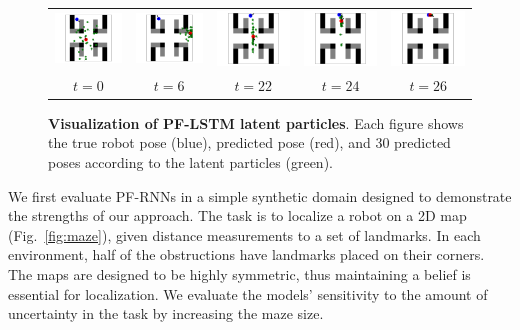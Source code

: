 \documentclass[letterpaper]{article} %
\begin{document}
\begin{figure}[t]
	\centering
	\begin{tabular}{ccccc}
		\includegraphics[width=0.18\linewidth]{figs/0.pdf} &
		\includegraphics[width=0.18\linewidth]{figs/6.pdf} &
		\includegraphics[width=0.18\linewidth]{figs/22.pdf} &
		\includegraphics[width=0.18\linewidth]{figs/24.pdf} &
		\includegraphics[width=0.18\linewidth]{figs/26.pdf} \\
		$t=0$ & $t=6$ & $t=22$ & $t=24$ & $t=26$
	\end{tabular}
	\caption{\textbf{Visualization of PF-LSTM latent particles}. Each figure shows the true robot pose (blue), predicted pose (red), and 30 predicted poses according to the latent particles (green).}
	\label{fig:vis}
\end{figure}

We first evaluate PF-RNNs in a simple synthetic  domain 
designed to demonstrate the strengths of our approach.
The task is to localize a robot on a 2D  map (Fig.~\ref{fig:maze}),  given distance measurements to a set of landmarks.
In each environment, half of the obstructions have landmarks placed on their corners. The maps are designed to be highly symmetric, thus maintaining a belief is essential for localization.
We evaluate the models' sensitivity to the amount of uncertainty in the task by increasing the maze size.
\end{document}
